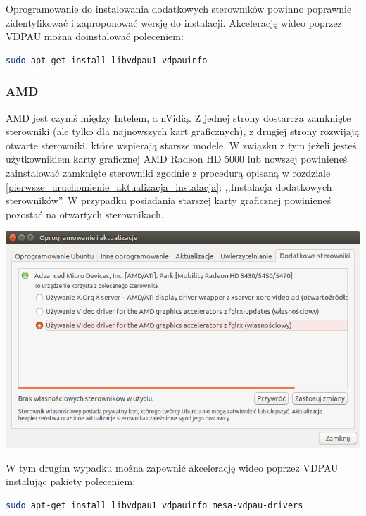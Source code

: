 Oprogramowanie do instalowania dodatkowych sterowników powinno poprawnie zidentyfikować i zaproponować wersję do instalacji.
Akcelerację wideo poprzez VDPAU można doinstalować poleceniem:

\begin{lstlisting}[language=bash]
sudo apt-get install libvdpau1 vdpauinfo
\end{lstlisting}

\subsubsection{AMD}
AMD jest czymś między Intelem, a nVidią. Z jednej strony dostarcza zamknięte sterowniki (ale tylko dla najnowszych kart graficznych), z drugiej strony rozwijają otwarte sterowniki, które wspierają starsze modele. W związku z tym jeżeli jesteś użytkownikiem karty graficznej AMD Radeon HD 5000 lub nowszej powinieneś zainstalować zamknięte sterowniki zgodnie z procedurą opisaną w rozdziale \ref{pierwsze_uruchomienie_aktualizacja_instalacja}: ,,Instalacja dodatkowych sterowników''. W przypadku posiadania starszej karty graficznej powinieneś pozostać na otwartych sterownikach.

\begin{center}
	\includegraphics[width=\linewidth]{images/sterowniki_AMD.png}
\end{center}


W tym drugim wypadku można zapewnić akcelerację wideo poprzez VDPAU instalując pakiety poleceniem:
\begin{lstlisting}[language=bash]
sudo apt-get install libvdpau1 vdpauinfo mesa-vdpau-drivers
\end{lstlisting}